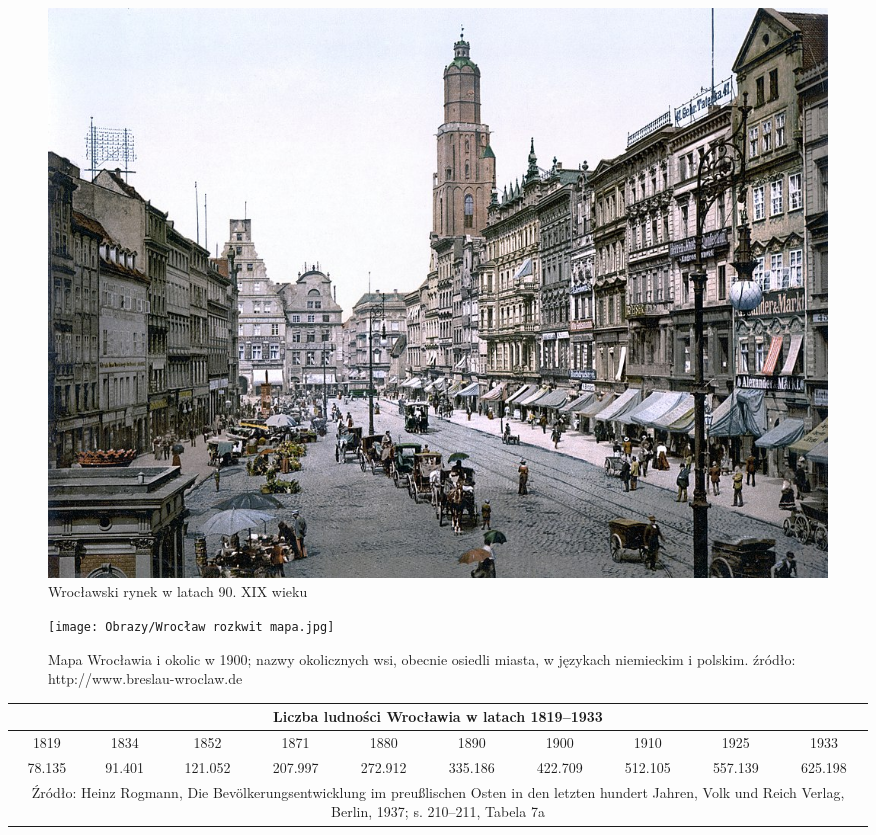 \documentclass{article}
\begin{document}
\begin{figure}[h!]
\centering
\begin{adjustwidth}{-.5in}{-.5in}  
\includegraphics[scale=0.4]{Obrazy/Wrocław 90.jpg}
\end{adjustwidth}
\caption{Wrocławski rynek w latach 90. XIX wieku}
\label{fig:90}
\end{figure}

\begin{figure}[ht]
\centering
\texttt{[image: Obrazy/Wrocław rozkwit mapa.jpg]}
\caption{Mapa Wrocławia i okolic w 1900;
nazwy okolicznych wsi, obecnie osiedli miasta, w językach niemieckim i polskim.
źródło: http://www.breslau-wroclaw.de}
\label{fig:rozkwit}
\end{figure}

\begin{table}[h!]
\begin{adjustwidth}{-.7in}{-.5in}  
\begin{tabular}{|c|c|c|c|c|c|c|c|c|c|}
\hline
\multicolumn{10}{|c|}{Liczba ludności Wrocławia w latach 1819–1933} \\
\hline
\hline
1819 &1834 & 1852 & 1871 & 1880 & 1890 & 1900 & 1910 & 1925 & 1933 \\
\hline
\hline
78.135 & 91.401 & 121.052 & 207.997 & 272.912 & 335.186 & 422.709 & 512.105 & 557.139 & 625.198\\
\hline
\hline
\multicolumn{10}{|p{15cm}|}{Źródło: Heinz Rogmann, Die Bevölkerungsentwicklung im preußlischen Osten in den letzten hundert Jahren,
Volk und Reich Verlag, Berlin, 1937; s. 210–211, Tabela 7a} \\
\hline
\end{tabular}\\
\label{tab:my_label}
\end{adjustwidth}
\end{table}
\label{fig:tabela}
\end{document}
